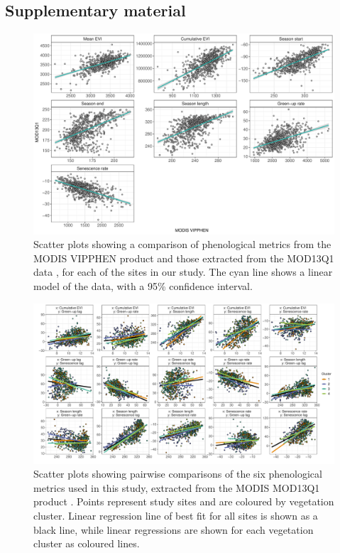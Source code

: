 \begin{refsection}
\section{Supplementary material}
\label{phen:sec:supp}
\begin{supplement} 

\begin{figure}[H]
	\includegraphics[width=\linewidth]{img/vipphen_compare}
	\caption[Scatter plots comparing MOD13Q1 and MODIS VIPPHEN phenological measurements]{Scatter plots showing a comparison of phenological metrics from the MODIS VIPPHEN product \citep{VIPPHEN} and those extracted from the MOD13Q1 data \citep{MOD13Q1}, for each of the sites in our study. The cyan line shows a linear model of the data, with a 95\% confidence interval.}
	\label{phen:vipphen_compare}
\end{figure}



\begin{landscape}
\begin{figure}[H]
	\includegraphics[width=0.9\linewidth]{img/phen_bivar}
	\caption[Bivariate comparison of phenological metrics]{Scatter plots showing pairwise comparisons of the six phenological metrics used in this study, extracted from the MODIS MOD13Q1 product \citep{MOD13Q1}. Points represent study sites and are coloured by vegetation cluster. Linear regression line of best fit for all sites is shown as a black line, while linear regressions are shown for each vegetation cluster as coloured lines.}
	\label{phen:phen_bivar}
\end{figure}
\end{landscape}


\end{supplement}
\end{refsection}
